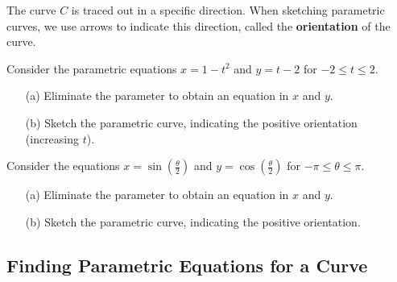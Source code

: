 \documentclass[12pt]{article}
\begin{document}
The curve $C$ is traced out in a specific direction. When sketching parametric curves, we use arrows to indicate this direction, called the \textbf{orientation} of the curve.
\newpage

\Example Consider the parametric equations $x=1-t^2$ and $y=t-2$ for $-2\leq t\leq 2$. 
\begin{enumerate}
	\item[(a)] Eliminate the parameter to obtain an equation in $x$ and $y$.
	
	\vfill
	
	\item[(b)] Sketch the parametric curve, indicating the positive orientation (increasing $t$). 
	
	\vfill
	\vfill
\end{enumerate}

\Example Consider the equations $x=\sin\left(\frac{\theta}{2}\right)$ and $y=\cos\left(\frac{\theta}{2}\right)$ for $-\pi\leq\theta\leq\pi$.
\begin{enumerate}
	\item[(a)] Eliminate the parameter to obtain an equation in $x$ and $y$.
	
	\vfill
	
	\item[(b)] Sketch the parametric curve, indicating the positive orientation. 
	
	\vfill
	\vfill
\end{enumerate}

\newpage

\subsection*{Finding Parametric Equations for a Curve}

\end{document}
